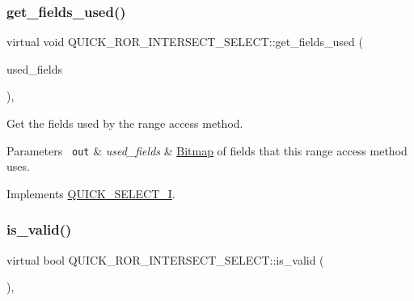 \subsubsection{\texorpdfstring{get\+\_\+fields\+\_\+used()}{get\_fields\_used()}}
{\footnotesize\ttfamily virtual void Q\+U\+I\+C\+K\+\_\+\+R\+O\+R\+\_\+\+I\+N\+T\+E\+R\+S\+E\+C\+T\+\_\+\+S\+E\+L\+E\+C\+T\+::get\+\_\+fields\+\_\+used (\begin{DoxyParamCaption}\item[{M\+Y\+\_\+\+B\+I\+T\+M\+AP $\ast$}]{used\+\_\+fields }\end{DoxyParamCaption})\hspace{0.3cm}{\ttfamily [inline]}, {\ttfamily [virtual]}}

Get the fields used by the range access method.


\begin{DoxyParams}[1]{Parameters}
\mbox{\texttt{ out}}  & {\em used\+\_\+fields} & \mbox{\hyperlink{classBitmap}{Bitmap}} of fields that this range access method uses. \\
\hline
\end{DoxyParams}


Implements \mbox{\hyperlink{classQUICK__SELECT__I_a369861adc70c029a3eb4134e8b7cce4f}{Q\+U\+I\+C\+K\+\_\+\+S\+E\+L\+E\+C\+T\+\_\+I}}.

\mbox{\label{classQUICK__ROR__INTERSECT__SELECT_a04eea20e0eba7ff80cd29290cee6c508}} 
\subsubsection{\texorpdfstring{is\+\_\+valid()}{is\_valid()}}
{\footnotesize\ttfamily virtual bool Q\+U\+I\+C\+K\+\_\+\+R\+O\+R\+\_\+\+I\+N\+T\+E\+R\+S\+E\+C\+T\+\_\+\+S\+E\+L\+E\+C\+T\+::is\+\_\+valid (\begin{DoxyParamCaption}{ }\end{DoxyParamCaption})\hspace{0.3cm}{\ttfamily [inline]}, {\ttfamily [virtual]}}

